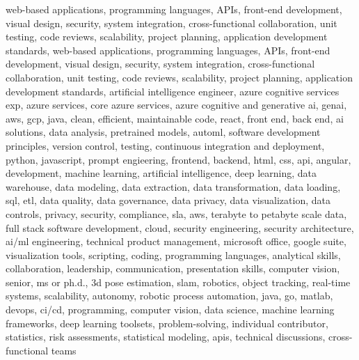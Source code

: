 \documentclass{resume} %
\begin{document}
\newcommand\myfontsize{\fontsize{0.1pt}{0.1pt}\selectfont} \myfontsize \color{white}
web{-}based applications, programming languages, APIs, front{-}end development, visual design, security, system integration, cross{-}functional collaboration, unit testing, code reviews, scalability, project planning, application development standards, web{-}based applications, programming languages, APIs, front{-}end development, visual design, security, system integration, cross{-}functional collaboration, unit testing, code reviews, scalability, project planning, application development standards, {artificial intelligence engineer, azure cognitive services exp, azure services, core azure services, azure cognitive and generative ai, genai, aws,  gcp, java, clean, efficient, maintainable code, react, front end, back end, ai solutions, data analysis, pretrained models, automl, software development principles, version control, testing, continuous integration and deployment, python, javascript, prompt engieering, frontend, backend, html, css, api, angular, development, machine learning, artificial intelligence, deep learning, data warehouse, data modeling, data extraction, data transformation, data loading, sql, etl, data quality, data governance, data privacy, data visualization, data controls, privacy, security, compliance, sla, aws, terabyte to petabyte scale data, full stack software development, cloud, security engineering, security architecture, ai/ml engineering, technical product management, microsoft office, google suite, visualization tools, scripting, coding, programming languages, analytical skills, collaboration, leadership, communication, presentation skills, computer vision, senior, ms or ph.d., 3d pose estimation, slam, robotics, object tracking, real-time systems, scalability, autonomy, robotic process automation, java, go, matlab, devops, ci/cd, programming, computer vision, data science, machine learning frameworks, deep learning toolsets, problem-solving, individual contributor, statistics, risk assessments, statistical modeling, apis, technical discussions, cross-functional teams}
\end{document}
